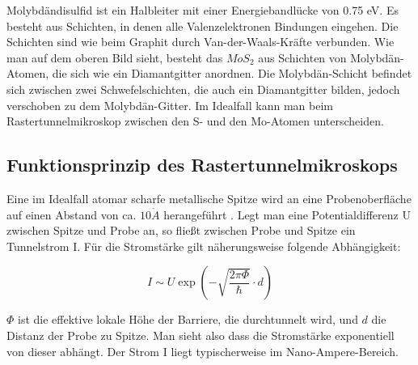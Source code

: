 Molybdändisulfid ist ein Halbleiter mit einer Energiebandlücke von 0.75 eV. Es besteht aus Schichten, in denen alle Valenzelektronen Bindungen eingehen. Die Schichten sind wie beim Graphit durch Van-der-Waals-Kräfte verbunden. Wie man auf dem oberen Bild sieht, besteht das $MoS_2$ aus Schichten von Molybdän-Atomen, die sich wie ein Diamantgitter anordnen. Die Molybdän-Schicht befindet sich zwischen zwei Schwefelschichten, die auch ein Diamantgitter bilden, jedoch verschoben zu dem Molybdän-Gitter. Im Idealfall kann man beim Rastertunnelmikroskop zwischen den S- und den Mo-Atomen unterscheiden.

\subsection{Funktionsprinzip des Rastertunnelmikroskops}

Eine im Idealfall atomar scharfe metallische Spitze wird an eine Probenoberfläche auf einen Abstand von ca. $10 \mathring A$ herangeführt . Legt man eine Potentialdifferenz U zwischen Spitze und Probe an, so fließt zwischen Probe und Spitze ein Tunnelstrom I. Für die Stromstärke gilt näherungsweise folgende Abhängigkeit:

$$ I \sim U\exp\left(-\sqrt{\frac{2\pi\Phi}{\hbar}}\cdot d\right) $$

$\Phi$ ist die effektive lokale Höhe der Barriere, die durchtunnelt wird, und $d$ die Distanz der Probe zu Spitze. Man sieht also dass die Stromstärke exponentiell von dieser abhängt. Der Strom I liegt typischerweise im Nano-Ampere-Bereich.

